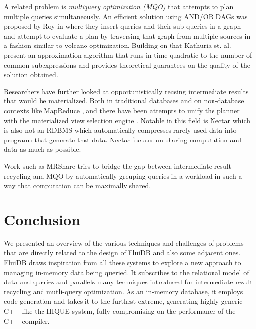 A related problem is \emph{multiquery optimization (MQO)}
\cite{theodoratosDataWarehouseConfiguration1997} that attempts to plan
multiple queries simultaneously. An efficient solution using AND/OR
DAGs was proposed by Roy in
\cite{royEfficientExtensibleAlgorithms2000} where they insert queries
and their sub-queries in a graph and attempt to evaluate a plan by
traversing that graph from multiple sources in a fashion similar to
volcano optimization. Building on that Kathuria
et. al. \cite{kathuriaEfficientProvableMultiquery2017} present an
approximation algorithm that runs in time quadratic to the number of
common subexpressions and provides theoretical guarantees on the
quality of the solution obtained.

Researchers have further looked at opportunistically reusing
intermediate results that would be materialized. Both in traditional
databases
\cite{ivanovaArchitectureRecyclingIntermediates2010,nagelRecyclingPipelinedQuery2013}
and on non-database contexts like MapReduce
\cite{elghandourReStoreReusingResults2012a}, and there have been
attempts to unify the planner with the materialized view selection
engine \cite{perezHistoryawareQueryOptimization2014a}. Notable in this
field is Nectar \cite{gundaNectarAutomaticManagement2010} which is
also not an RDBMS which automatically compresses rarely used data into
programs that generate that data. Nectar focuses on sharing
computation and data as much as possible.

Work such as MRShare \cite{nykielMRShareSharingMultiple2010} tries to
bridge the gap between intermediate result recycling and MQO by
automatically grouping queries in a workload in such a way that
computation can be maximally shared.

\section{Conclusion}

We presented an overview of the various techniques and challenges of
problems that are directly related to the design of FluiDB and also
some adjacent ones. FluiDB draws inspiration from all these systems to
explore a new approach to managing in-memory data being queried. It
subscribes to the relational model of data and queries and parallels
many techniques introduced for intermediate result recycling and mutli-query
optimization. As an in-memory database, it employs code
generation and takes it to the furthest extreme, generating highly
generic C++ like the HIQUE system, fully compromising on the
performance of the C++ compiler.
